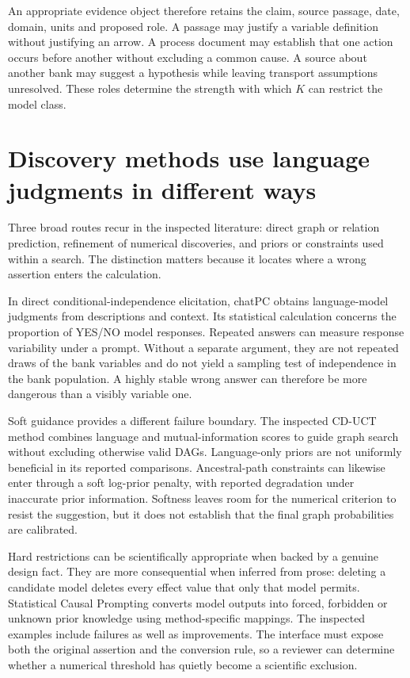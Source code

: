 An appropriate evidence object therefore retains the claim, source passage,
date, domain, units and proposed role. A passage may justify a variable
definition without justifying an arrow. A process document may establish that
one action occurs before another without excluding a common cause. A source
about another bank may suggest a hypothesis while leaving transport assumptions
unresolved. These roles determine the strength with which $K$ can restrict the
model class.

\section{Discovery methods use language judgments in different ways}

Three broad routes recur in the inspected literature: direct graph or relation
prediction, refinement of numerical discoveries, and priors or constraints used
within a search.\cite{v12_la_2402_11068} The distinction matters because it locates
where a wrong assertion enters the calculation.

In direct conditional-independence elicitation, chatPC obtains language-model
judgments from descriptions and context. Its statistical calculation concerns
the proportion of YES/NO model responses.\cite{v12_la_2406_07378} Repeated answers
can measure response variability under a prompt. Without a separate argument,
they are not repeated draws of the bank variables and do not yield a sampling
test of independence in the bank population. A highly stable wrong answer can
therefore be more dangerous than a visibly variable one.

Soft guidance provides a different failure boundary. The inspected CD-UCT
method combines language and mutual-information scores to guide graph search
without excluding otherwise valid DAGs. Language-only priors are not uniformly
beneficial in its reported comparisons.\cite{v12_la_2405_13551} Ancestral-path
constraints can likewise enter through a soft log-prior penalty, with reported
degradation under inaccurate prior information.\cite{v12_la_2306_16902} Softness
leaves room for the numerical criterion to resist the suggestion, but it does
not establish that the final graph probabilities are calibrated.

Hard restrictions can be scientifically appropriate when backed by a genuine
design fact. They are more consequential when inferred from prose: deleting a
candidate model deletes every effect value that only that model permits.
Statistical Causal Prompting converts model outputs into forced, forbidden or
unknown prior knowledge using method-specific mappings. The inspected examples
include failures as well as improvements.\cite{v12_la_2402_01454} The interface
must expose both the original assertion and the conversion rule, so a reviewer
can determine whether a numerical threshold has quietly become a scientific
exclusion.

